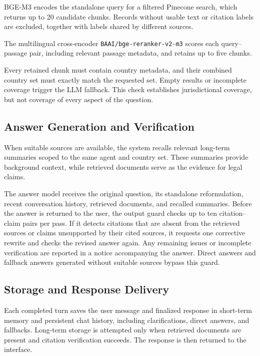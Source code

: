 \documentclass[a4paper,12pt]{report}
\begin{document}
BGE-M3 encodes the standalone query for a filtered Pinecone search,
which returns up to 20 candidate chunks. Records without usable text
or citation labels are excluded, together with labels shared by
different sources.

The multilingual cross-encoder
\texttt{BAAI/bge-reranker-v2-m3} scores each query--passage pair,
including relevant passage metadata, and retains up to five chunks.

Every retained chunk must contain country metadata, and their combined
country set must exactly match the requested set. Empty results or
incomplete coverage trigger the LLM fallback. This check establishes
jurisdictional coverage, but not coverage of every aspect of the question.

\subsection{Answer Generation and Verification}

When suitable sources are available, the system recalls relevant long-term summaries scoped to the same agent and country set. These summaries provide background context, while retrieved documents serve as the evidence for legal claims.

The answer model receives the original question, its standalone reformulation, recent conversation history, retrieved documents, and recalled summaries. Before the answer is returned to the user, the output guard checks up to ten citation–claim pairs per pass. If it detects citations that are absent from the retrieved sources or claims unsupported by their cited sources, it requests one corrective rewrite and checks the revised answer again. Any remaining issues or incomplete verification are reported in a notice accompanying the answer. Direct answers and fallback answers generated without suitable sources bypass this guard.


\subsection{Storage and Response Delivery}

Each completed turn saves the user message and finalized response
in short-term memory and persistent chat history, including
clarifications, direct answers, and fallbacks. Long-term storage is
attempted only when retrieved documents are present and citation
verification succeeds. The response is then returned to the interface.
\end{document}

